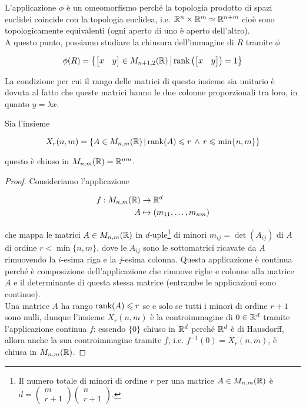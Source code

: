 L'applicazione $ \phi $ è un omeomorfismo perché la topologia prodotto di spazi euclidei coincide con la topologia euclidea, i.e. $ \mathbb{R}^{n} \times \mathbb{R}^{m} \simeq \mathbb{R}^{n+m} $ cioè sono topologicamente equivalenti (ogni aperto di uno è aperto dell'altro).\\
A questo punto, possiamo studiare la chiusura dell'immagine di $ R $ tramite $ \phi $

\begin{equation}
	\phi(R) = \left\{ \mqty[x & y] \in M_{n+1,2}(\R) \, \middle| \, \rank \left( \mqty[x & y] \right) = 1 \right\}
\end{equation}

La condizione per cui il rango delle matrici di questo insieme sia unitario è dovuta al fatto che queste matrici hanno le due colonne proporzionali tra loro, in quanto $ y= \lambda x $.

\begin{lemma}\label{lemma-clos-matrix}
	Sia l'insieme
	
	\begin{equation}
		X_{r}(n,m) = \left\{ A \in M_{n,m}(\mathbb{R}) \, \middle| \, \rank(A) \leqslant r \, \wedge \, r \leqslant \min\{n,m\} \right\}
	\end{equation}

	questo è chiuso in $ M_{n,m}(\mathbb{R}) = \mathbb{R}^{n m} $.
\end{lemma}

\begin{proof}
	Consideriamo l'applicazione
	
	\begin{align}
		\begin{split}
			f :  M_{n,m}(\mathbb{R}) &\to \mathbb{R}^{d}\\
			A &\mapsto (m_{11},\dots,m_{nm})
		\end{split}
	\end{align}

	che mappa le matrici $ A \in M_{n,m}(\mathbb{R}) $ in $ d $-uple\footnote{%
		Il numero totale di minori di ordine $ r $ per una matrice $ A \in M_{n,m}(\mathbb{R}) $ è $ d = \begin{pmatrix} m \\ r+1 \end{pmatrix} \begin{pmatrix} n \\ r+1 \end{pmatrix} $.%
	} di minori $ m_{ij} = \det(A_{ij}) $ di $ A $ di ordine $ r < \min\{n,m\} $, dove le $ A_{ij} $ sono le sottomatrici ricavate da $ A $ rimuovendo la $ i $-esima riga e la $ j $-esima colonna. Questa applicazione è continua perché è composizione dell'applicazione che rimuove righe e colonne alla matrice $ A $ e il determinante di questa stessa matrice (entrambe le applicazioni sono continue).\\
	Una matrice $ A $ ha rango $ \rank(A) \leqslant r $ se e solo se tutti i minori di ordine $ r+1 $ sono nulli, dunque l'insieme $ X_{r}(n,m) $ è la controimmagine di $ 0 \in \mathbb{R}^{d} $ tramite l'applicazione continua $ f $: essendo $ \{0\} $ chiuso in $ \mathbb{R}^{d} $ perché $ \mathbb{R}^{d} $ è di Hausdorff, allora anche la sua controimmagine tramite $ f $, i.e. $ f^{-1}(0) = X_{r}(n,m) $, è chiusa in $ M_{n,m}(\mathbb{R}) $.
\end{proof}

